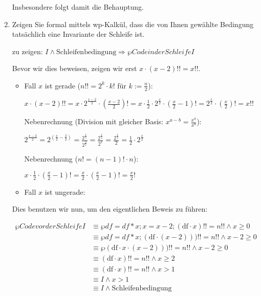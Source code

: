 \documentclass{lehramt-informatik-aufgabe}
\begin{document}
\begin{enumerate}
\begin{antwort}
Insbesondere folgt damit die Behauptung.
\end{antwort}


\item Zeigen Sie formal mittels wp-Kalkül, dass die von Ihnen gewählte
Bedingung tatsächlich eine Invariante der Schleife ist.

\begin{antwort}
zu zeigen: $I \land \text{Schleifenbedingung} \Rightarrow \wp{Code in der Schleife}{I}$

Bevor wir dies beweisen, zeigen wir erst $x \cdot (x − 2)!! = x!!$.

\begin{itemize}
\item Fall $x$ ist gerade ($n!! = 2^k \cdot k!$ für $k := \frac{n}{2}$):

$x \cdot (x - 2)!! =
x \cdot 2^\frac{x - 2}{2} \cdot (\frac{x - 2}{2})! =
x \cdot \frac{1}{2} \cdot 2^\frac{x}{2} \cdot (\frac{x}{2} - 1)! =
2^\frac{x}{2} \cdot (\frac{x}{2})! =
x!!
$

Nebenrechnung (Division mit gleicher Basis: $x^{a-b} = \frac{x^a}{x^b}$):

$2^\frac{x - 2}{2} =
2^{(\frac{x}{2} - \frac{2}{2})} =
\frac{2^\frac{x}{2}}{2^\frac{2}{2}} =
\frac{2^\frac{x}{2}}{2^1} =
\frac{2^\frac{x}{2}}{2} =
\frac{1}{2} \cdot 2^\frac{x}{2}
$

Nebenrechnung ($n! = (n - 1)! \cdot n$):

$x \cdot \frac{1}{2} \cdot (\frac{x}{2} - 1)! =
\frac{x}{2} \cdot (\frac{x}{2} - 1)! =
\frac{x}{2}!
$

\item Fall $x$ ist ungerade:
\end{itemize}

Dies benutzen wir nun, um den eigentlichen Beweis zu führen:

\begin{align*}
\wp{Code vor der Schleife}{I}
& \equiv \wp{df = df * x; x = x - 2;}{(\text{df} \cdot x)!! = n!! \land x \geq 0} \\
& \equiv \wp{df = df * x;}{(\text{df} \cdot (x - 2)))!! = n!! \land x - 2 \geq 0} \\
& \equiv \wp{}{(\text{df} \cdot x \cdot (x - 2)))!! = n!! \land x - 2 \geq 0} \\
& \equiv (\text{df} \cdot x)!! = n!! \land x \geq 2 \\
& \equiv (\text{df} \cdot x)!! = n!! \land x > 1 \\
& \equiv I \land x > 1 \\
& \equiv I \land \text{Schleifenbedingung} \\
\end{align*}
\end{antwort}


\end{enumerate}
\end{document}
